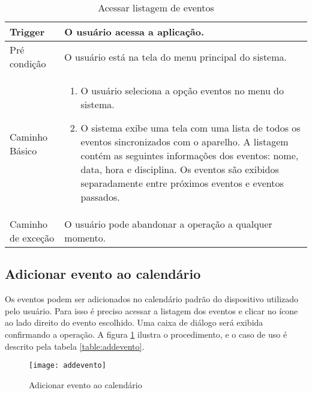 \begin{table}[H]
  \begin{tabular}{ p{} | p{} }
    Trigger & O usuário acessa a aplicação.\\
    \hline
    Pré condição & O usuário está na tela do menu principal do sistema.\\
    \hline
    Caminho Básico &
    \begin{minipage}{5in}
      \vskip 4pt
      \begin{enumerate}
        \item O usuário seleciona a opção eventos no menu do sistema.
        \item O sistema exibe uma tela com uma lista de todos os eventos sincronizados com o aparelho. A listagem contém as seguintes informações dos eventos: nome, data, hora e disciplina. Os eventos são exibidos separadamente entre próximos eventos e eventos passados.
      \end{enumerate}
      \vskip 4pt
    \end{minipage} \\
    \hline
    Caminho de exceção & O usuário pode abandonar a operação a qualquer momento.\\
    \hline
  \end{tabular}
  \caption{Acessar listagem de eventos}
  \label{table:indexeventos}
\end{table}

\subsection{Adicionar evento ao calendário}

Os eventos podem ser adicionados no calendário padrão do dispositivo utilizado pelo usuário. Para isso é preciso acessar a listagem dos eventos e clicar no ícone ao lado direito do evento escolhido. Uma caixa de diálogo será exibida confirmando a operação. A figura \ref{addevento} ilustra o procedimento, e o caso de uso é descrito pela tabela \ref{table:addevento}.

\begin{figure}[H]
    \centering
\texttt{[image: addevento]}
    \caption{Adicionar evento ao calendário}
    \label{addevento}
\end{figure}

